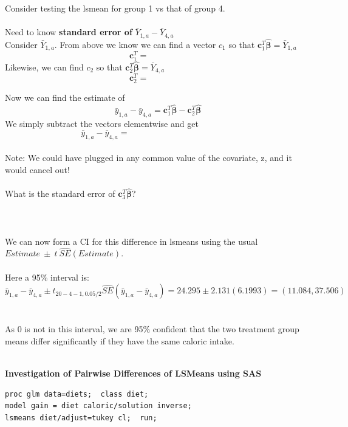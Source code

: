 Consider testing the lsmean for group 1 vs that of group 4. \\~\\
Need to know \textbf{standard error of }$\bar{Y}_{1,a}-\bar{Y}_{4,a}$\\

Consider $\bar{Y}_{1,a}$.  From above we know we can find a vector $c_1$ so that $\textbf{c}^{T}_1\hat{\boldsymbol{\beta}} = \bar{Y}_{1,a}$ 
$$\textbf{c}_1^{T}=~~~~~~~~~~~~~~~~~~~~$$
Likewise, we can find $c_2$ so that $\textbf{c}^{T}_2\hat{\boldsymbol{\beta}} = \bar{Y}_{4,a}$ 
$$\textbf{c}_2^{T}=~~~~~~~~~~~~~~~~~~~~$$

Now we can find the estimate of 
$$\bar{y}_{1,a}-\bar{y}_{4,a} = \textbf{c}^{T}_1\hat{\boldsymbol{\beta}}-\textbf{c}^{T}_2\hat{\boldsymbol{\beta}}$$
We simply subtract the vectors elementwise and get
$$\bar{y}_{1,a}-\bar{y}_{4,a}= ~~~~~~~~~~~~~~~~~~~~~~~~~~~~~~~~~~~~~~~~~~~~~~~~~~~~~~~~$$~\\

Note: We could have plugged in any common value of the covariate, z, and it would cancel out!\\~\\

What is the standard error of $\textbf{c}^{T}_3\hat{\boldsymbol{\beta}}$?\\~\\~\\~\\
We can now form a CI for this difference in lsmeans using the usual $Estimate~\pm~t~\hat{SE}(Estimate)$.\\~\\
Here a 95\% interval is: 
$$\bar{y}_{1,a}-\bar{y}_{4,a}\pm t_{20-4-1,0.05/2}\hat{SE}(\bar{y}_{1,a}-\bar{y}_{4,a}) =  24.295\pm 2.131(6.1993) = (11.084,37.506)$$\\~\\
As 0 is not in this interval, we are 95\% confident that the two treatment group means differ significantly if they have the same caloric intake.\\~\\

\newpage

\Large\textbf{Investigation of Pairwise Differences of LSMeans using SAS}\large
\begin{small}
\begin{verbatim}
proc glm data=diets;  class diet;
model gain = diet caloric/solution inverse;
lsmeans diet/adjust=tukey cl;  run;
\end{verbatim}
\end{small}

